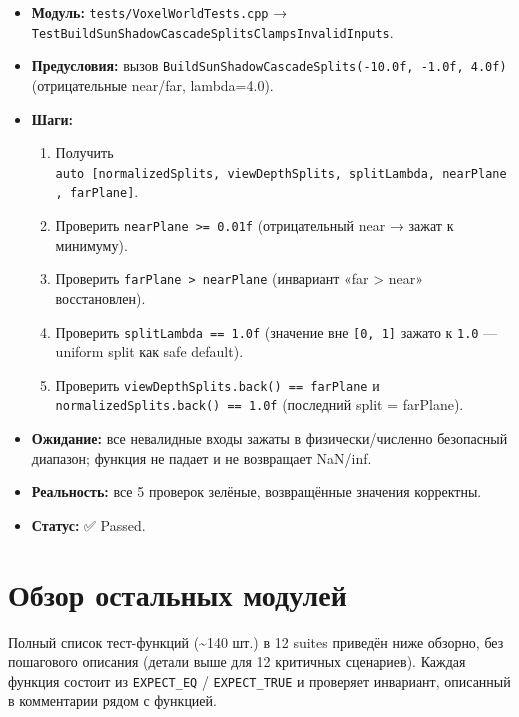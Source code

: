 \begin{itemize}
\tightlist
\item
  \textbf{Модуль:} \texttt{tests/VoxelWorldTests.cpp} → \texttt{TestBuildSunShadowCascadeSplitsClampsInvalidInputs}.
\item
  \textbf{Предусловия:} вызов \texttt{BuildSunShadowCascadeSplits(-10.0f,\ -1.0f,\ 4.0f)} (отрицательные near/far, lambda=4.0).
\item
  \textbf{Шаги:}

  \begin{enumerate}
  \def\labelenumi{\arabic{enumi}.}
  \tightlist
  \item
    Получить \texttt{auto\ {[}normalizedSplits,\ viewDepthSplits,\ splitLambda,\ nearPlane,\ farPlane{]}}.
  \item
    Проверить \texttt{nearPlane\ \textgreater{}=\ 0.01f} (отрицательный near → зажат к минимуму).
  \item
    Проверить \texttt{farPlane\ \textgreater{}\ nearPlane} (инвариант «far \textgreater{} near» восстановлен).
  \item
    Проверить \texttt{splitLambda\ ==\ 1.0f} (значение вне \texttt{{[}0,\ 1{]}} зажато к \texttt{1.0} --- uniform split как safe default).
  \item
    Проверить \texttt{viewDepthSplits.back()\ ==\ farPlane} и \texttt{normalizedSplits.back()\ ==\ 1.0f} (последний split = farPlane).
  \end{enumerate}
\item
  \textbf{Ожидание:} все невалидные входы зажаты в физически/численно безопасный диапазон; функция не падает и не возвращает NaN/inf.
\item
  \textbf{Реальность:} все 5 проверок зелёные, возвращённые значения корректны.
\item
  \textbf{Статус:} ✅ Passed.
\end{itemize}

\section{Обзор остальных модулей}\label{KT-2.2_Test_Report-ux43eux431ux437ux43eux440-ux43eux441ux442ux430ux43bux44cux43dux44bux445-ux43cux43eux434ux443ux43bux435ux439}

Полный список тест-функций (\textasciitilde140 шт.) в 12 suites приведён ниже обзорно, без пошагового описания (детали выше для 12 критичных сценариев). Каждая функция состоит из \texttt{EXPECT\_EQ} / \texttt{EXPECT\_TRUE} и проверяет инвариант, описанный в комментарии рядом с функцией.

